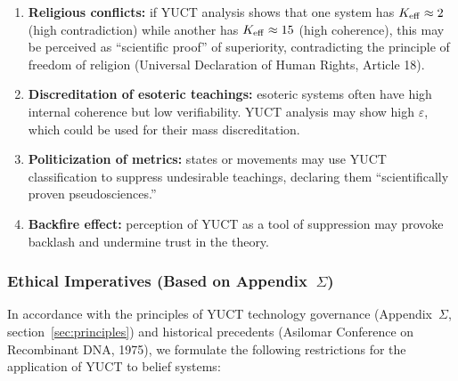 \documentclass[12pt,a4paper]{article}
\newcommand{\eps}{\varepsilon}
\begin{document}
	\begin{enumerate}
		\item \textbf{Religious conflicts:} if YUCT analysis shows that one system has $\Keff \approx 2$ (high contradiction) while another has $\Keff \approx 15$ (high coherence), this may be perceived as ``scientific proof'' of superiority, contradicting the principle of freedom of religion (Universal Declaration of Human Rights, Article 18).
		
		\item \textbf{Discreditation of esoteric teachings:} esoteric systems often have high internal coherence but low verifiability. YUCT analysis may show high $\eps$, which could be used for their mass discreditation.
		
		\item \textbf{Politicization of metrics:} states or movements may use YUCT classification to suppress undesirable teachings, declaring them ``scientifically proven pseudosciences.''
		
		\item \textbf{Backfire effect:} perception of YUCT as a tool of suppression may provoke backlash and undermine trust in the theory.
	\end{enumerate}
	
	\subsubsection{Ethical Imperatives (Based on Appendix~$\Sigma$)}
	
	In accordance with the principles of YUCT technology governance (Appendix~$\Sigma$, section~\ref{sec:principles}) and historical precedents (Asilomar Conference on Recombinant DNA, 1975), we formulate the following restrictions for the application of YUCT to belief systems:
	
\end{document}
